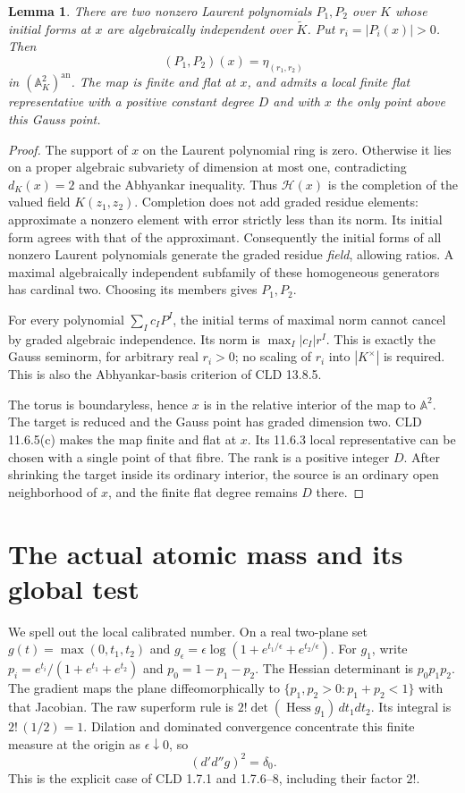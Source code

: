 \documentclass[11pt]{article}
\newcommand{\DD}{d'd''}
\newtheorem{lemma}[theorem]{Lemma}
\theoremstyle{remark}\newtheorem{remark}[theorem]{Remark}
\begin{document}
\begin{lemma}\label{moments}
There are two nonzero Laurent polynomials $P_1,P_2$ over $K$
whose initial forms at $x$ are algebraically independent over
$\widetilde K$. Put $r_i=|P_i(x)|>0$. Then
\[
 (P_1,P_2)(x)=\eta_{(r_1,r_2)}
\]
in $(\mathbb A_K^2)^{\mathrm{an}}$. The map is finite and flat at
$x$, and admits a local finite flat representative with a positive
constant degree $D$ and with $x$ the only point above this Gauss point.
\end{lemma}
\begin{proof}
The support of $x$ on the Laurent polynomial ring is zero.
Otherwise it lies on a proper algebraic subvariety of dimension
at most one, contradicting $d_K(x)=2$ and the Abhyankar inequality.
Thus $\mathscr H(x)$ is the completion of the valued field
$K(z_1,z_2)$. Completion does not add graded residue elements:
approximate a nonzero element with error strictly less than its
norm. Its initial form agrees with that of the approximant.
Consequently the initial forms of all nonzero Laurent polynomials
generate the graded residue \emph{field}, allowing ratios.
A maximal algebraically independent subfamily of these homogeneous
generators has cardinal two. Choosing its members gives $P_1,P_2$.

For every polynomial $\sum_I c_IP^I$, the initial terms of maximal
norm cannot cancel by graded algebraic independence. Its norm is
$\max_I|c_I|r^I$. This is exactly the Gauss seminorm, for arbitrary
real $r_i>0$; no scaling of $r_i$ into $|K^\times|$ is required.
This is also the Abhyankar-basis criterion of CLD 13.8.5.

The torus is boundaryless, hence $x$ is in the relative interior
of the map to $\mathbb A^2$. The target is reduced and the Gauss
point has graded dimension two. CLD 11.6.5(c) makes the map finite
and flat at $x$. Its 11.6.3 local representative can be chosen
with a single point of that fibre. The rank is a positive integer
$D$. After shrinking the target inside its ordinary interior,
the source is an ordinary open neighborhood of $x$, and the finite
flat degree remains $D$ there.
\end{proof}

\section{The actual atomic mass and its global test}
We spell out the local calibrated number.
On a real two-plane set $g(t)=\max(0,t_1,t_2)$ and
$g_\epsilon=\epsilon\log(1+e^{t_1/\epsilon}+e^{t_2/\epsilon})$.
For $g_1$, write $p_i=e^{t_i}/(1+e^{t_1}+e^{t_2})$ and
$p_0=1-p_1-p_2$. The Hessian determinant is $p_0p_1p_2$.
The gradient maps the plane diffeomorphically to
$\{p_1,p_2>0:p_1+p_2<1\}$ with that Jacobian.
The raw superform rule is $2!\det(\operatorname{Hess}g_1)\,dt_1dt_2$.
Its integral is $2!\,(1/2)=1$.
Dilation and dominated convergence concentrate this finite measure
at the origin as $\epsilon\downarrow0$, so
\[
 (\DD g)^2=\delta_0.
\]
This is the explicit case of CLD 1.7.1 and 1.7.6--8, including
their factor $2!$.
\end{document}
